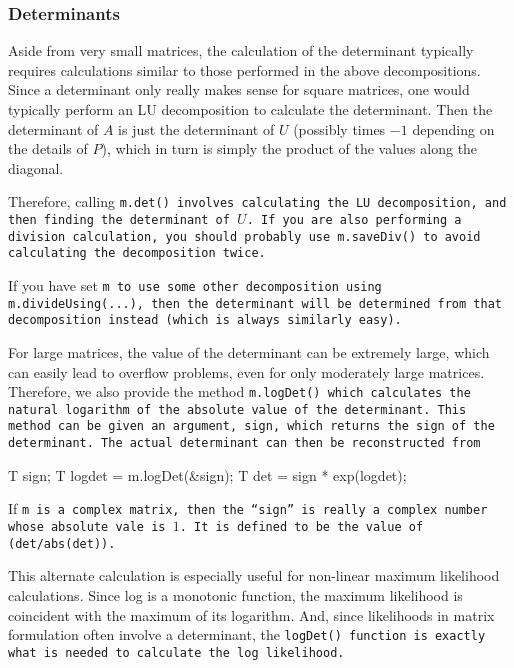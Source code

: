 \subsubsection{Determinants}
\label{Matrix_Division_Determinants}

Aside from very small matrices, the calculation of the determinant typically 
requires calculations similar to those performed in
the above decompositions.  Since a determinant only really makes sense
for square matrices, one would typically perform an LU decomposition to calculate
the determinant.  Then the determinant of $A$ is just the determinant of $U$
(possibly times $-1$ depending on the details of $P$), which in turn is simply the 
product of the values along the diagonal.

Therefore, calling \tt{m.det()} involves calculating the LU decomposition, and then
finding the determinant of $U$.  
If you are also performing a division calculation, you should probably use
\tt{m.saveDiv()} to avoid calculating the decomposition twice.

If you have set \tt{m} to use some other decomposition using 
\tt{m.divideUsing(...)},
then the determinant will be determined from that decomposition instead 
(which is always similarly easy).

For large matrices, the value of the determinant can be extremely large, which can easily
lead to overflow problems, even for only moderately large matrices.  Therefore, we
also provide the method \tt{m.logDet()} which calculates the natural logarithm of the
absolute value of the determinant.  This method can be given an argument, \tt{sign},
which returns the sign of the determinant.  The actual determinant can then be 
reconstructed from 
\begin{tmvcode}
T sign;
T logdet = m.logDet(&sign);
T det = sign * exp(logdet);
\end{tmvcode}
If \tt{m} is a complex matrix, then the ``sign'' is really a complex number whose 
absolute vale is $1$. It is defined to be the value of \tt{(det/abs(det))}.

This alternate calculation is especially useful for non-linear maximum likelihood
calculations.  Since log is a monotonic function, the maximum likelihood is coincident
with the maximum of its logarithm.  And, since likelihoods in matrix formulation
often involve a determinant,
the \tt{logDet()} function is exactly what is needed to calculate the log likelihood.

